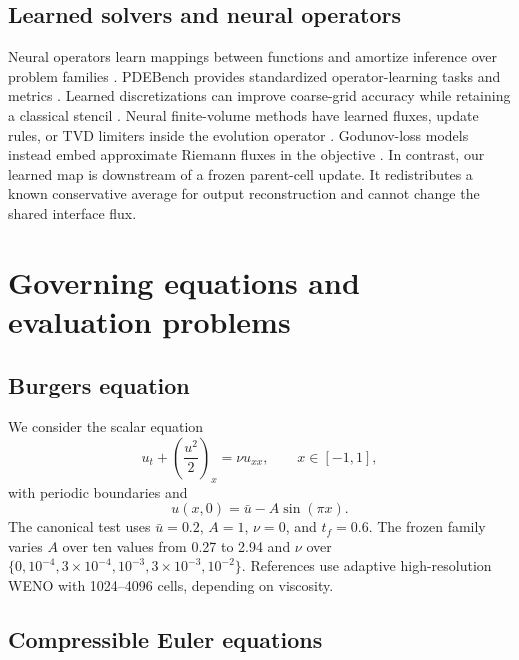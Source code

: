 \documentclass[10pt,twocolumn]{article}
\begin{document}
\subsection{Learned solvers and neural operators}

Neural operators learn mappings between functions and amortize inference over problem families \citep{lu2021deeponet,li2021fno}. PDEBench provides standardized operator-learning tasks and metrics \citep{takamoto2022pdebench}. Learned discretizations can improve coarse-grid accuracy while retaining a classical stencil \citep{barsinai2019discretization,kochkov2021cfd}. Neural finite-volume methods have learned fluxes, update rules, or TVD limiters inside the evolution operator \citep{lichtle2025unfv,huang2025tvd}. Godunov-loss models instead embed approximate Riemann fluxes in the objective \citep{cassia2024godunovloss}. In contrast, our learned map is downstream of a frozen parent-cell update. It redistributes a known conservative average for output reconstruction and cannot change the shared interface flux.

\section{Governing equations and evaluation problems}

\subsection{Burgers equation}

We consider the scalar equation
\begin{equation}
  u_t + \left(\frac{u^2}{2}\right)_x = \nu u_{xx},
  \qquad x\in[-1,1],
  \label{eq:burgers}
\end{equation}
with periodic boundaries and
\begin{equation}
  u(x,0)=\bar u-A\sin(\pi x).
\end{equation}
The canonical test uses $\bar u=0.2$, $A=1$, $\nu=0$, and $t_f=0.6$. The frozen family varies $A$ over ten values from 0.27 to 2.94 and $\nu$ over $\{0,10^{-4},3\times10^{-4},10^{-3},3\times10^{-3},10^{-2}\}$. References use adaptive high-resolution WENO with 1024--4096 cells, depending on viscosity.

\subsection{Compressible Euler equations}
\end{document}
